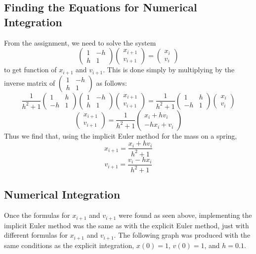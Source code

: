 \documentclass{article}
\begin{document}
\subsection{Finding the Equations for Numerical Integration}
From the assignment, we need to solve the system
\[
\begin{pmatrix}
    1 & -h \\
    h & 1
\end{pmatrix}
\begin{pmatrix}
    x_{i+1} \\
    v_{i+1}
\end{pmatrix}
=
\begin{pmatrix}
    x_i \\
    v_i
\end{pmatrix}
\]
to get function of $x_{i+1}$ and $v_{i+1}$. This is done simply by multiplying by the inverse matrix of
$\begin{pmatrix}
    1 & -h \\
    h & 1
\end{pmatrix}$ as follows:
\[
\frac{1}{h^2 + 1}
\begin{pmatrix}
    1 & h \\
    -h & 1
\end{pmatrix}
\begin{pmatrix}
    1 & -h \\
    h & 1
\end{pmatrix}
\begin{pmatrix}
    x_{i+1} \\
    v_{i+1}
\end{pmatrix}
=
\frac{1}{h^2 + 1}
\begin{pmatrix}
    1 & h \\
    -h & 1
\end{pmatrix}
\begin{pmatrix}
    x_i \\
    v_i
\end{pmatrix}
\]
\[
\begin{pmatrix}
    x_{i+1} \\
    v_{i+1}
\end{pmatrix}
=
\frac{1}{h^2 + 1}
\begin{pmatrix}
    x_i + hv_i \\
    -hx_i + v_i
\end{pmatrix}
\]
Thus we find that, using the implicit Euler method for the mass on a spring,
$$ x_{i+1} = \frac{x_i + hv_i}{h^2 + 1} $$
$$ v_{i+1} = \frac{v_i - hx_i}{h^2 + 1} $$

\subsection{Numerical Integration}
Once the formulas for $ x_{i+1} $ and $ v_{i+1} $ were found as seen above, implementing the implicit Euler method was the same as with the explicit Euler method, just with different formulas for $ x_{i+1} $ and $ v_{i+1} $. The following graph was produced with the same conditions as the explicit integration, $ x(0) = 1 $, $ v(0) = 1 $, and $ h = 0.1 $.
\end{document}
